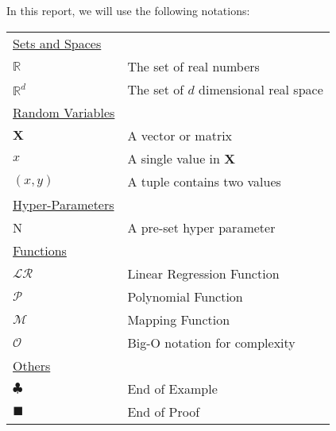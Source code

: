 In this report, we will use the following notations:

\begin{table}[h]
\begin{tabularx}{\textwidth}{@{}XX@{}}
\toprule
  \underline{Sets and Spaces} \\
  $\mathbb{R}$ & The set of real numbers \\
  $\mathbb{R}^d$ & The set of $d$ dimensional real space \\
  \underline{Random Variables} \\
  $\textbf{X}$ & A vector or matrix \\
  $x$ & A single value in $\textbf{X}$ \\
  $(x,y)$ & A tuple contains two values \\	
  \underline{Hyper-Parameters} \\
  N   & A pre-set hyper parameter \\
  \underline{Functions} \\
  $\mathcal{LR}$ & Linear Regression Function\\
  $\mathcal{P}$ & Polynomial Function\\
  $\mathcal{M}$ & Mapping Function\\
  $\mathcal{O}$ & Big-O notation for complexity\\
  \underline{Others} \\
  $\clubsuit$ & End of Example \\
  $\blacksquare$ & End of Proof \\
\bottomrule
\end{tabularx}
\end{table}
